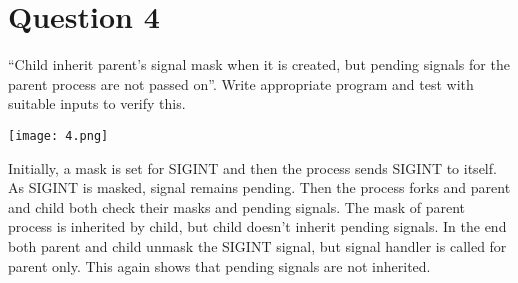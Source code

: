 \documentclass[main.tex]{subfiles}
\begin{document}
\section{Question 4}

“Child inherit parent’s signal mask when it is created, but pending signals for
the parent process are not passed on”. Write appropriate program and test with
suitable inputs to verify this.


\texttt{[image: 4.png]}

Initially, a mask is set for SIGINT and then the process sends SIGINT to itself.
As SIGINT is masked, signal remains pending. Then the process forks and parent
and child both check their masks and pending signals. The mask of parent process
is inherited by child, but child doesn't inherit pending signals. In the end
both parent and child unmask the SIGINT signal, but signal handler is called for
parent only. This again shows that pending signals are not inherited.

\clearpage
\end{document}
